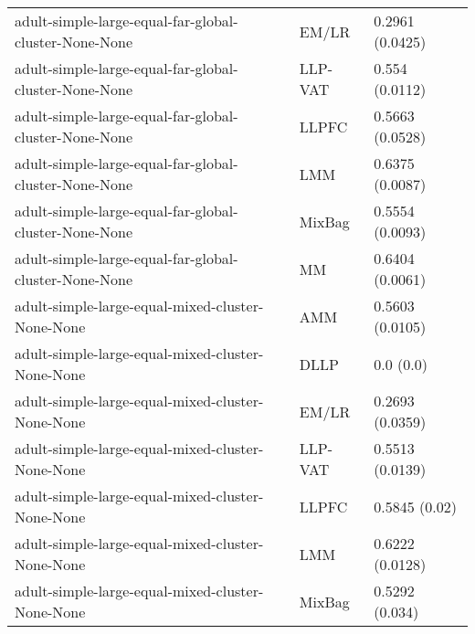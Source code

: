 \begin{longtable}{lll}
                                                        adult-simple-large-equal-far-global-cluster-None-None &     EM/LR &                       0.2961 (0.0425) \\
                                                        adult-simple-large-equal-far-global-cluster-None-None &   LLP-VAT &                        0.554 (0.0112) \\
                                                        adult-simple-large-equal-far-global-cluster-None-None &     LLPFC &                       0.5663 (0.0528) \\
                                                        adult-simple-large-equal-far-global-cluster-None-None &       LMM &                       0.6375 (0.0087) \\
                                                        adult-simple-large-equal-far-global-cluster-None-None &    MixBag &                       0.5554 (0.0093) \\
                                                        adult-simple-large-equal-far-global-cluster-None-None &        MM &                       0.6404 (0.0061) \\
                                                             adult-simple-large-equal-mixed-cluster-None-None &       AMM &                       0.5603 (0.0105) \\
                                                             adult-simple-large-equal-mixed-cluster-None-None &      DLLP &                             0.0 (0.0) \\
                                                             adult-simple-large-equal-mixed-cluster-None-None &     EM/LR &                       0.2693 (0.0359) \\
                                                             adult-simple-large-equal-mixed-cluster-None-None &   LLP-VAT &                       0.5513 (0.0139) \\
                                                             adult-simple-large-equal-mixed-cluster-None-None &     LLPFC &                         0.5845 (0.02) \\
                                                             adult-simple-large-equal-mixed-cluster-None-None &       LMM &                       0.6222 (0.0128) \\
                                                             adult-simple-large-equal-mixed-cluster-None-None &    MixBag &                        0.5292 (0.034) \\

\end{longtable}
